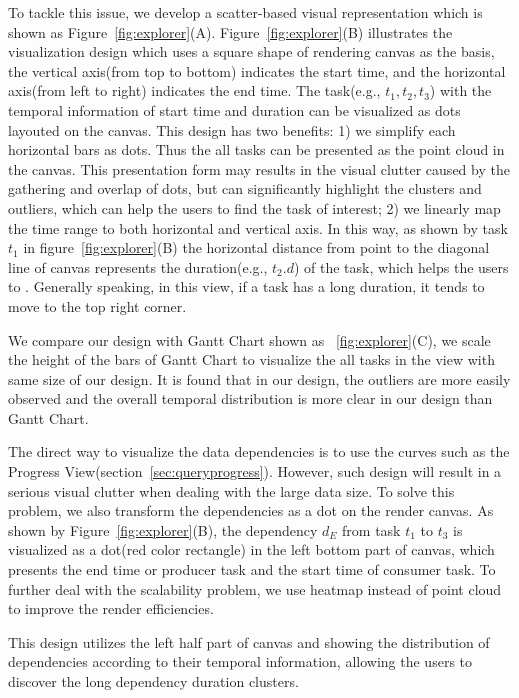To tackle this issue, we develop a scatter-based visual representation which is shown as Figure~\ref{fig:explorer}(A). Figure~\ref{fig:explorer}(B) illustrates the visualization design which uses a square shape of rendering canvas as the basis, the vertical axis(from top to bottom) indicates the start time, and the horizontal axis(from left to right) indicates the end time.
The task(e.g., $t_1, t_2, t_3$) with the temporal information of start time and duration can be visualized as dots layouted on the canvas. 
This design has two benefits: 1) we simplify each horizontal bars as dots. Thus the all tasks can be presented as the point cloud in the canvas. This presentation form may results in the visual clutter caused by the gathering and overlap of dots, but can significantly highlight the clusters and outliers, which can help the users to find the task of interest; 2) we linearly map the time range to both horizontal and vertical axis. In this way, as shown by task $t_1$ in figure~\ref{fig:explorer}(B) the horizontal distance from point to the diagonal line of canvas represents the duration(e.g., $t_2.d$) of the task, which helps the users to . Generally speaking, in this view, if a task has a long duration, it tends to move to the top right corner. 

We compare our design with Gantt Chart shown as ~\ref{fig:explorer}(C), we scale the height of the bars of Gantt Chart to visualize the all tasks in the view with same size of our design. It is found that in our design, the outliers are more easily observed and the overall temporal distribution is more clear in our design than Gantt Chart.

The direct way to visualize the data dependencies is to use the curves such as the Progress View(section~\ref{sec:queryprogress}). However, such design will result in a serious visual clutter when dealing with the large data size. To solve this problem, we also transform the dependencies as a dot on the render canvas. As shown by Figure~\ref{fig:explorer}(B), the dependency $d_E$ from task $t_1$ to $t_3$ is visualized as a dot(red color rectangle) in the left bottom part of canvas, which presents the end time or producer task and the start time of consumer task.  To further deal with the scalability problem, we use heatmap instead of point cloud to improve the render efficiencies.

This design utilizes the left half part of canvas and showing the distribution of dependencies according to their temporal information, allowing the users to discover the long dependency duration clusters. 

